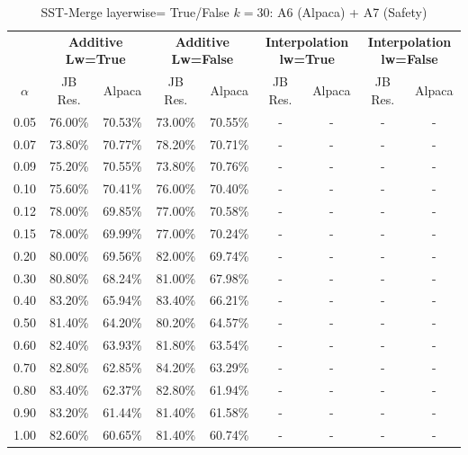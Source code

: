 \begin{table}[h]
\centering
\caption{SST-Merge layerwise= True/False $k=30$: A6 (Alpaca) + A7 (Safety)}
\label{tab:res_a6_sst_merge_30}
\begin{tabular}{c|cc|cc|cc|cc}
\hline
 & \multicolumn{2}{c|}{\textbf{Additive Lw=True}} & \multicolumn{2}{c|}{\textbf{Additive Lw=False}} & \multicolumn{2}{c|}{\textbf{Interpolation lw=True}}& \multicolumn{2}{c}{\textbf{Interpolation lw=False}} \\
$\alpha$ & JB Res. & Alpaca & JB Res. & Alpaca & JB Res. & Alpaca & JB Res. & Alpaca \\
\hline
0.05 & 76.00\% & 70.53\% & 73.00\% & 70.55\% & - & - & - & - \\
0.07 & 73.80\% & 70.77\% & 78.20\% & 70.71\% & - & - & - & - \\
0.09 & 75.20\% & 70.55\% & 73.80\% & 70.76\% & - & - & - & - \\
0.10 & 75.60\% & 70.41\% & 76.00\% & 70.40\% & - & - & - & - \\
0.12 & 78.00\% & 69.85\% & 77.00\% & 70.58\% & - & - & - & - \\
0.15 & 78.00\% & 69.99\% & 77.00\% & 70.24\% & - & - & - & - \\
0.20 & 80.00\% & 69.56\% & 82.00\% & 69.74\% & - & - & - & - \\
0.30 & 80.80\% & 68.24\% & 81.00\% & 67.98\% & - & - & - & - \\
0.40 & 83.20\% & 65.94\% & 83.40\% & 66.21\% & - & - & - & - \\
0.50 & 81.40\% & 64.20\% & 80.20\% & 64.57\% & - & - & - & - \\
0.60 & 82.40\% & 63.93\% & 81.80\% & 63.54\% & - & - & - & - \\
0.70 & 82.80\% & 62.85\% & 84.20\% & 63.29\% & - & - & - & - \\
0.80 & 83.40\% & 62.37\% & 82.80\% & 61.94\% & - & - & - & - \\
0.90 & 83.20\% & 61.44\% & 81.40\% & 61.58\% & - & - & - & - \\
1.00 & 82.60\% & 60.65\% & 81.40\% & 60.74\% & - & - & - & - \\
\hline
\end{tabular}
\end{table}
\FloatBarrier


